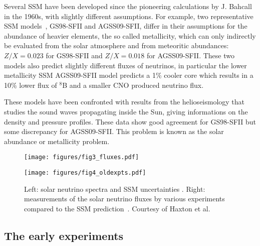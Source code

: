Several SSM have been developed since the pioneering calculations by J. Bahcall in the 1960s, with slightly different assumptions. For example, two representative SSM models~\cite{serenelli}, GS98-SFII and AGSS09-SFII, differ in their assumptions for the abundance of heavier elements, the so called metallicity, which can only indirectly be evaluated from the solar atmosphere and from meteoritic abundances: $Z/X=0.023$ for GS98-SFII and $Z/X=0.018$ for AGSS09-SFII. These two models also predict slightly different fluxes of neutrinos, in particular the lower metallicity SSM AGSS09-SFII model predicts a 1\% cooler core which results in a 10\% lower flux of $^8$B and a smaller CNO produced neutrino flux.  

These models have been confronted with results from the helioseismology that studies the sound waves propagating inside the Sun, giving informations on the density and pressure profiles.
These data show good agreement for GS98-SFII but some discrepancy for AGSS09-SFII. 
This problem is known as the solar abundance or metallicity problem.


\begin{figure}[htbp]
\begin{minipage}[c]{.46\linewidth}
   	      \texttt{[image: figures/fig3\_fluxes.pdf]}
   \end{minipage} \hfill
   \begin{minipage}{.46\linewidth}
      \texttt{[image: figures/fig4\_oldexpts.pdf]}
   \end{minipage}
    \caption{
Left: solar neutrino spectra and SSM uncertainties \cite{serenelli}.
Right: measurements of the solar neutrino fluxes by various experiments compared to the SSM prediction~\cite{serenelli}. Courtesy of Haxton et al.
}
\label{fig:sol-spectra}
\end{figure}




\subsection{The early experiments}

